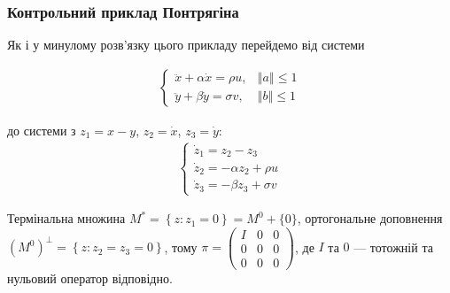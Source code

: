 \documentclass[10pt,pdf,aspectratio=169]{beamer}
\renewcommand{\d}[1]{\dot{#1}}
\newcommand{\dd}[1]{\ddot{#1}}
\renewcommand{\l}{\left}
\renewcommand{\r}{\right}
\newcommand{\norm}[1]{\left\Vert #1 \right\Vert}
\begin{document}
    \begin{frame}
        \frametitle{Контрольний приклад Понтрягіна}
    
        Як і у минулому розв’язку цього прикладу перейдемо від системи
    
        \begin{gather*}
            \begin{cases}
                \dd{x} + \alpha \d{x} = \rho u, & \norm{a} \leq 1 \\
                \dd{y} + \beta \d{y} = \sigma v, & \norm{b} \leq 1
            \end{cases}
        \end{gather*}

        до системи з $z_1 = x - y$, $z_2 = \d{x}$, $z_3 = \d{y}$:
        \begin{gather*}
            \begin{cases}
                \d{z}_1 = z_2 - z_3 \\
                \d{z}_2 = -\alpha z_2 + \rho u \\
                \d{z}_3 = -\beta z_3 + \sigma v
            \end{cases}
        \end{gather*}

        Термінальна множина $M^* = \l\{z: z_1 = 0 \r\} = M^0 + \{0\}$, ортогональне доповнення
        $(M^0)^\perp =\l\{z: z_2 = z_3 = 0 \r\}$, тому $\pi = \begin{pmatrix}
            I & 0 & 0 \\
            0 & 0 & 0 \\
            0 & 0 & 0
        \end{pmatrix}$, де $I$ та $0$ --- тотожній та нульовий оператор відповідно.

    \end{frame}
\end{document}
